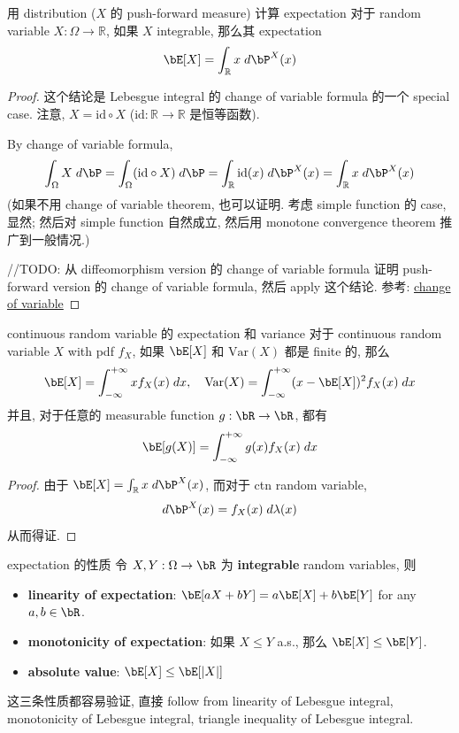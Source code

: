 \begin{lemma}{用 distribution (\(X\) 的 push-forward measure) 计算 expectation}\label{用 distribution 计算 expectation}
    对于 random variable \(X: \Omega \to \mathbb{R}\), 如果 \(X\) integrable, 那么其 expectation
    \[
    \bE[X] = \int_{\mathbb{R}} x \;d\bP^X(x)
    \]
\end{lemma}
\begin{proof}
    这个结论是 Lebesgue integral 的 change of variable formula 的一个 special case.
    注意, \(X = \text{id} \circ X\) (\(\text{id}: \mathbb{R} \to \mathbb{R}\) 是恒等函数).

    By change of variable formula,
    \[
    \int_\Omega X \;d\bP = \int_\Omega (\text{id} \circ X) \;d\bP = \int_{\mathbb{R}} \text{id}(x) \;d\bP^X(x) = \int_{\mathbb{R}} x \;d\bP^X(x)
    \]
    (如果不用 change of variable theorem, 也可以证明. 考虑 simple function 的 case, 显然;
    然后对 simple function 自然成立, 然后用 monotone convergence theorem 推广到一般情况.)

    //TODO: 从 diffeomorphism version 的 change of variable formula 证明 push-forward version 
    的 change of variable formula, 然后 apply 这个结论.
    参考: \href{https://en.wikipedia.org/wiki/Change_of_variables}{change of variable}
\end{proof}




\begin{proposition}{continuous random variable 的 expectation 和 variance}\label{continuous random variable 的 expectation 和 variance}
    对于 continuous random variable \(X\) with pdf \(f_X\), 如果 \(\bE[X]\) 和 \(\text{Var}(X)\) 都是 finite 的, 那么
    \[
    \bE[X] = \int_{-\infty}^{+\infty} x f_X(x) \;dx, \quad \text{Var}(X) = \int_{-\infty}^{+\infty} (x-\bE[X])^2 f_X(x) \;dx
    \]
    并且, 对于任意的 measurable function \(g: \bR \to \bR\), 都有
    \[
    \bE[g(X)] = \int_{-\infty}^{+\infty} g(x) f_X(x) \;dx
    \]
\end{proposition}
\begin{proof}
    由于 \(\bE[X] = \int_{\mathbb{R}} x \;d\bP^X(x)\), 而对于 ctn random variable, \[
    d\bP^X(x) = f_X(x) \;d\lambda(x)
    \]
    从而得证.
\end{proof}


\begin{proposition}{expectation 的性质}
令 \(X,Y:\Omega \to \bR\) 为 \textbf{integrable} random variables,  则
\begin{itemize}
    \item \textbf{linearity of expectation}: \(\bE[aX + bY] = a\bE[X] + b\bE[Y]\) for any \(a,b \in \bR\).
    \item \textbf{monotonicity of expectation}: 如果 \(X \leq Y\) a.s., 那么 \(\bE[X] \leq \bE[Y]\).
    \item \textbf{absolute value}: \(\bE[X] \leq \bE[|X|]\)
\end{itemize}
\end{proposition}
这三条性质都容易验证, 直接 follow from linearity of Lebesgue integral,
 monotonicity of Lebesgue integral, triangle inequality of Lebesgue integral.




